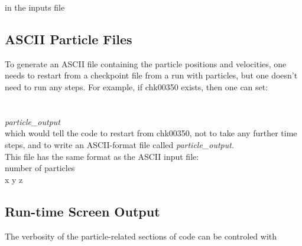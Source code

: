 \noindent in the inputs file

\subsection{ASCII Particle Files}

To generate an ASCII file containing the particle positions and velocities, 
one needs to restart from a checkpoint file from a run with particles, but one doesn't need to run any steps.
For example, if chk00350 exists, then one can set: \\

 \\
 \\
 {\em particle\_output} \\

\noindent which would tell the code to restart from chk00350, not to take any further time steps, and to write an ASCII-format 
file called {\em particle\_output}. \\

\noindent This file has the same format as the ASCII input file: \\

\noindent number of particles \\ 
x y z  \\


\subsection{Run-time Screen Output}

The verbosity of the particle-related sections of code can be controled with

 \\
